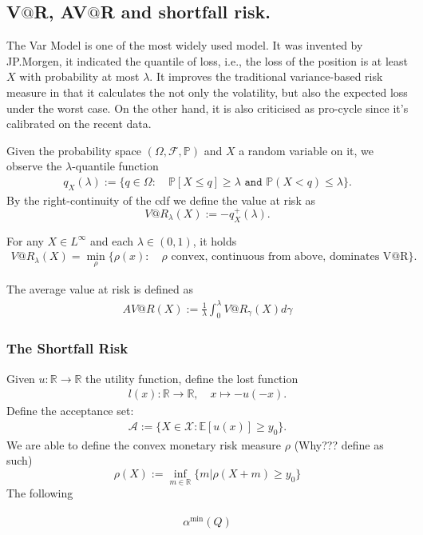 \subsection{\texorpdfstring{V$@$R, AV$@$R and shortfall risk.}{VaR, AVaR and shortfall risk.}}
The Var Model is one of the most widely used model. It was invented by JP.Morgen, it indicated the quantile of loss, i.e., the loss of the position is at least $X$ with probability at most $\lambda$. It improves the traditional variance-based risk measure in that it calculates the not only the volatility, but also the expected loss under the worst case. On the other hand, it is also criticised as pro-cycle since it's calibrated on the recent data. 
\begin{definition}
	Given the probability space $(\Omega, \mathcal{F}, \mathbb{P})$ and $X$ a random variable on it, we observe the $\lambda$-quantile function
	\begin{align*}
		q_X(\lambda):= \{q \in \Omega:\quad \mathbb{P}[X \le q] \ge \lambda \texttt{ and } \mathbb{P}(X < q) \le \lambda \}. 
	\end{align*}
	By the right-continuity of the cdf we define the value at risk as
	\begin{equation}
		V@R_\lambda(X):= -q^+_X(\lambda). 
	\end{equation}
\end{definition}

\begin{proposition}
	For any $X \in L^\infty$ and each $\lambda \in (0, 1)$, it holds
	\begin{align*}
		V@R_\lambda(X) = \min_\rho \{ \rho(x): \quad \rho \text{ convex,  continuous from above, dominates V@R} \}.  
	\end{align*}
\end{proposition}

\begin{definition}[AV@R]
The average value at risk is defined as
\begin{align*}
	AV@R (X):= \frac{1}{\lambda} \int_0^\lambda V@R_\gamma (X) d\gamma
\end{align*}
\end{definition}


\subsubsection{The Shortfall Risk}
Given $u: \mathbb{R} \rightarrow \mathbb{R}$ the utility function, define the lost function
\begin{align*}
	l(x): \mathbb{R} \rightarrow \mathbb{R}, \quad x \mapsto - u(-x). 
\end{align*}
Define the acceptance set:
\begin{align*}
	\mathcal{A} := \{ X \in \mathcal{X}:  \mathbb{E}[u(x)] \ge y_0 \}.
\end{align*}
We are able to define the convex monetary risk measure $\rho$ (Why??? define as such)
\begin{equation}
	\rho(X):= \inf_{ m \in \mathbb{R}} \{ m |\rho(X + m) \ge y_0 \}
\end{equation}
The following 

\begin{definition}
\begin{align*}
	\alpha^{\min}(Q)
\end{align*}
\end{definition}

